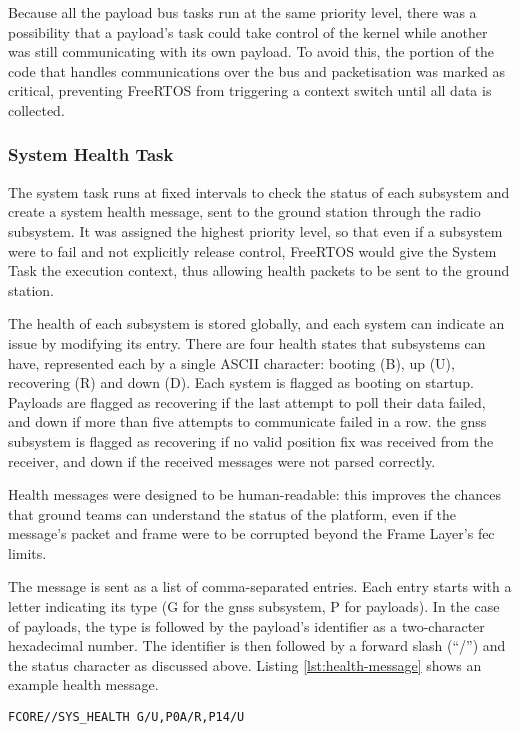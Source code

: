 Because all the payload bus tasks run at the same priority level, there was a
possibility that a payload's task could take control of the kernel while another
was still communicating with its own payload. To avoid this, the portion of the
code that handles communications over the bus and packetisation was marked
as critical, preventing FreeRTOS from triggering a context switch until all data
is collected.

\subsubsection{System Health Task}

The system task runs at fixed intervals to check the status of each subsystem
and create a system health message, sent to the ground station through the
radio subsystem. It was assigned the highest priority level, so that even if a
subsystem were to fail and not explicitly release control, FreeRTOS would give
the System Task the execution context, thus allowing health packets to be sent
to the ground station.

The health of each subsystem is stored globally, and each system can indicate
an issue by modifying its entry. There are four health states that subsystems
can have, represented each by a single ASCII character: booting (B), up (U),
recovering (R) and down (D). Each system is flagged as booting on startup.
Payloads are flagged as recovering if the last attempt to poll their data
failed, and down if more than five attempts to communicate failed in a row.
the \acrshort{gnss} subsystem is flagged as recovering if no valid position
fix was received from the receiver, and down if the received messages were not
parsed correctly.

Health messages were designed to be human-readable: this improves the chances
that ground teams can understand the status of the platform, even if the
message's packet and frame were to be corrupted beyond the Frame Layer's
\acrshort{fec} limits.

The message is sent as a list of comma-separated entries. Each entry starts
with a letter indicating its type (G for the \acrshort{gnss} subsystem, P for
payloads). In the case of payloads, the type is followed by the payload's
identifier as a two-character hexadecimal number. The identifier is then
followed by a forward slash (``/'') and the status character as discussed above.
Listing \ref{lst:health-message} shows an example health message.

\begin{lstlisting}[caption=FCORE - Example Health Message, label=lst:health-message]
FCORE//SYS_HEALTH G/U,P0A/R,P14/U
\end{lstlisting}

